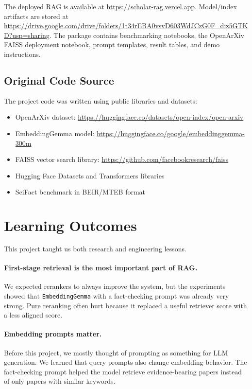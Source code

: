 \documentclass[11pt,a4paper]{article}
\begin{document}
The deployed RAG is available at \url{https://scholar-rag.vercel.app}. Model/index artifacts are stored at \url{https://drive.google.com/drive/folders/1t34rEBA0vsvD603WdJCzG0F_diz5GTKD?usp=sharing}. The package contains benchmarking notebooks, the OpenArXiv FAISS deployment notebook, prompt templates, result tables, and demo instructions.

\subsection{Original Code Source}

The project code was written using public libraries and datasets:

\begin{itemize}
    \item OpenArXiv dataset: \url{https://huggingface.co/datasets/open-index/open-arxiv}
    \item EmbeddingGemma model: \url{https://huggingface.co/google/embeddinggemma-300m}
    \item FAISS vector search library: \url{https://github.com/facebookresearch/faiss}
    \item Hugging Face Datasets and Transformers libraries
    \item SciFact benchmark in BEIR/MTEB format
\end{itemize}


\section{Learning Outcomes}

This project taught us both research and engineering lessons.

\paragraph{First-stage retrieval is the most important part of RAG.}
We expected rerankers to always improve the system, but the experiments showed that \texttt{EmbeddingGemma} with a fact-checking prompt was already very strong. Pure reranking often hurt because it replaced a useful retriever score with a less aligned score.

\paragraph{Embedding prompts matter.}
Before this project, we mostly thought of prompting as something for LLM generation. We learned that query prompts also change embedding behavior. The fact-checking prompt helped the model retrieve evidence-bearing papers instead of only papers with similar keywords.
\end{document}
